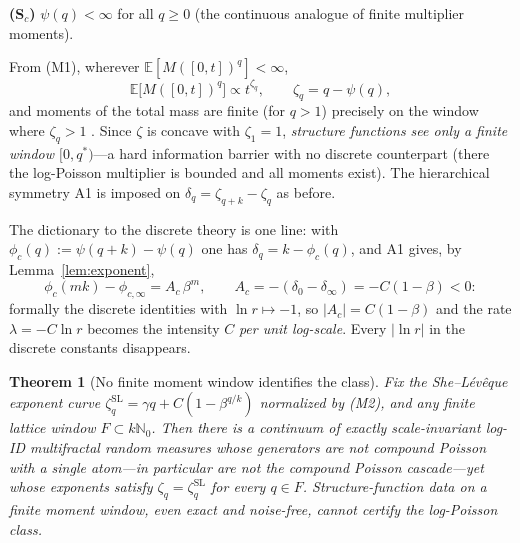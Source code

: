 \documentclass[12pt]{amsart}
\newtheorem{theorem}{Theorem}
\theoremstyle{definition}
\theoremstyle{remark}
\begin{document}
\smallskip
\noindent\textbf{(S$_c$)}  $\psi(q) < \infty$ for all $q \ge 0$ (the
continuous analogue of finite multiplier moments).

\smallskip
From (M1), wherever $\mathbb{E}[M([0,t])^q] < \infty$,
\[
  \mathbb{E}\bigl[M([0,t])^q\bigr] \propto t^{\zeta_q},
  \qquad
  \zeta_q = q - \psi(q),
\]
and moments of the total mass are finite (for $q > 1$) precisely on
the window where $\zeta_q > 1$ \cite{BM03}.  Since $\zeta$ is
concave with $\zeta_1 = 1$, \emph{structure functions see only a
finite window $[0, q^*)$}---a hard information barrier with no
discrete counterpart (there the log-Poisson multiplier is bounded
and all moments exist).  The hierarchical symmetry A1 is imposed on
$\delta_q = \zeta_{q+k} - \zeta_q$ as before.

The dictionary to the discrete theory is one line: with $\phi_c(q)
:= \psi(q+k) - \psi(q)$ one has $\delta_q = k - \phi_c(q)$, and A1
gives, by Lemma~\ref{lem:exponent},
\[
  \phi_c(mk) - \phi_{c,\infty} = A_c\,\beta^m,
  \qquad
  A_c = -(\delta_0 - \delta_\infty) = -C(1-\beta) < 0 :
\]
formally the discrete identities with $\ln r \mapsto -1$, so $|A_c|
= C(1-\beta)$ and the rate $\lambda = -C\ln r$ becomes the intensity
$C$ \emph{per unit log-scale}.  Every $|\ln r|$ in the discrete
constants disappears.

\begin{theorem}[No finite moment window identifies the
class]\label{thm:window}
Fix the She--L\'ev\^eque exponent curve $\zeta^{\mathrm{SL}}_q =
\gamma q + C(1-\beta^{q/k})$ normalized by \textup{(M2)}, and any
finite lattice window $F \subset k\mathbb{N}_0$.  Then there is a
continuum of exactly scale-invariant log-ID multifractal random
measures whose generators are not compound Poisson with a single
atom---in particular are not the compound Poisson cascade---yet
whose exponents satisfy $\zeta_q = \zeta^{\mathrm{SL}}_q$ for every
$q \in F$.  Structure-function data on a finite moment window, even
exact and noise-free, cannot certify the log-Poisson class.
\end{theorem}
\end{document}
